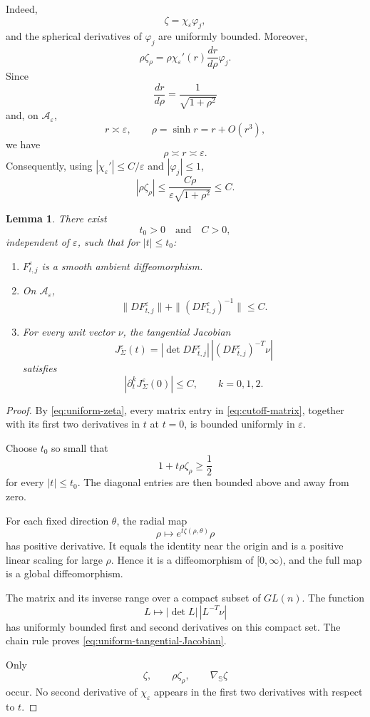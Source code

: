 \documentclass[11pt,reqno]{amsart}
\numberwithin{equation}{section}
\newtheorem{lemma}[theorem]{Lemma}
\theoremstyle{definition}
\theoremstyle{remark}
\newcommand{\eps}{\varepsilon}
\begin{document}
Indeed,
\[
\zeta=\chi_\eps\varphi_j,
\]
and the spherical derivatives of \(\varphi_j\) are uniformly bounded.
Moreover,
\[
\rho\zeta_\rho
=
\rho\chi_\eps'(r)
\frac{dr}{d\rho}
\varphi_j.
\]
Since
\[
\frac{dr}{d\rho}=\frac{1}{\sqrt{1+\rho^2}}
\]
and, on \(\mathcal A_\eps\),
\[
r\asymp\eps,
\qquad
\rho=\sinh r=r+O(r^3),
\]
we have
\[
\rho\asymp r\asymp\eps.
\]
Consequently, using
\(|\chi_\eps'|\le C/\eps\) and \(|\varphi_j|\le1\),
\[
|\rho\zeta_\rho|
\le
\frac{C\rho}{\eps\sqrt{1+\rho^2}}
\le C.
\]

\begin{lemma}
\label{lem:uniform-Jacobian}
There exist
\[
t_0>0
\quad\text{and}\quad
C>0,
\]
independent of \(\eps\), such that for \(|t|\le t_0\):

\begin{enumerate}[label=\textup{(\roman*)}]

\item
\(F^\eps_{t,j}\) is a smooth ambient diffeomorphism.

\item
On \(\mathcal A_\eps\),
\[
\|DF^\eps_{t,j}\|
+
\|(DF^\eps_{t,j})^{-1}\|
\le C.
\]

\item
For every unit vector \(\nu\), the tangential Jacobian
\[
J^\eps_\Sigma(t)
=
|\det DF^\eps_{t,j}|
\,
|(DF^\eps_{t,j})^{-T}\nu|
\]
satisfies
\begin{equation}
\left|
\partial_t^kJ^\eps_\Sigma(0)
\right|
\le C,
\qquad
k=0,1,2.
\label{eq:uniform-tangential-Jacobian}
\end{equation}

\end{enumerate}
\end{lemma}

\begin{proof}
By \eqref{eq:uniform-zeta}, every matrix entry in
\eqref{eq:cutoff-matrix}, together with its first two derivatives in \(t\)
at \(t=0\), is bounded uniformly in \(\eps\).

Choose \(t_0\) so small that
\[
1+t\rho\zeta_\rho
\ge\frac{1}{2}
\]
for every \(|t|\le t_0\). The diagonal entries are then bounded above and
away from zero.

For each fixed direction \(\theta\), the radial map
\[
\rho\longmapsto
e^{t\zeta(\rho,\theta)}\rho
\]
has positive derivative. It equals the identity near the origin and is a
positive linear scaling for large \(\rho\). Hence it is a diffeomorphism of
\([0,\infty)\), and the full map is a global diffeomorphism.

The matrix and its inverse range over a compact subset of \(GL(n)\).
The function
\[
L\longmapsto
|\det L|\,|L^{-T}\nu|
\]
has uniformly bounded first and second derivatives on this compact set.
The chain rule proves
\eqref{eq:uniform-tangential-Jacobian}.

Only
\[
\zeta,
\qquad
\rho\zeta_\rho,
\qquad
\nabla_{\mathbb S}\zeta
\]
occur. No second derivative of \(\chi_\eps\) appears in the first two
derivatives with respect to \(t\).
\end{proof}
\end{document}
